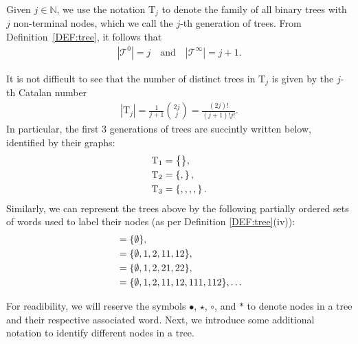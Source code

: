 \documentclass[a4paper,
11pt,  reqno]{amsart}
\makeatletter
\newcommand{\5}{\textup{V}}
\newcommand{\noi}{\noindent}
\theoremstyle{remark}
\newcommand{\bul}{\bullet}
\newcommand{\TT}{\mathcal{T}}
\newcommand{\Tr}{\mathrm{T}}
\newcommand{\N}{\mathbb{N}}
\def\<#1>{\csname MH@symb@#1\endcsname}
\numberwithin{equation}{section}
\numberwithin{theorem}{section}
\makeatother
\begin{document}
Given $j\in\N$, we use the notation $\Tr_j$ to denote the family of all binary trees
with $j$ non-terminal nodes, which we call the $j$-th generation of trees. From Definition~\ref{DEF:tree}, it follows that 
\begin{align}
| \TT^0 |  = j \quad \text{and} \quad |\TT^\infty| = j+1.
\end{align}


\noi
It is not difficult to see that the number of distinct trees in $\Tr_j$ is given by the $j$-th Catalan number
\begin{align}\label{eq:catalan}
| \Tr_j | = \frac{1}{j+1} \binom{2j}{j}  = \frac{(2j)!}{(j+1)! j !}.
\end{align}
In particular, the first 3 generations of trees are succintly written below, identified by their graphs:
\begin{align*}
\Tr_1 & = \big\{ \<1> \big\}, \\
\Tr_2 & = \left\{ \<21>, \<22> \right\}, \\
\Tr_3 &  = \left\{ \<31>, \<32>, \<33>, \<34>, \<35> \right\}.
\end{align*}
Similarly, we can represent the trees above by the following partially ordered sets of words used to label their nodes (as per Definition \ref{DEF:tree}(iv)):
\begin{align}
\<1> 
&
= \{\emptyset\}
, 
\\
\<21>
&
=
\{ \emptyset, 1 ,2, 11,12  \}
, 
\\
\<22>
&
=
\{\emptyset, 1,2, 21,22\}
, 
\\
\<31>
&
= 
\{
\emptyset, 1,2, 11,12, 111, 112
\}
, \ldots
\end{align}




\smallskip








For readibility, we will reserve the symbols $\bul$, $\star$, $\circ$, and $\ast$ to denote nodes in a tree and their respective associated word. 
Next, we introduce some additional notation to identify different nodes in a tree. 
\end{document}
